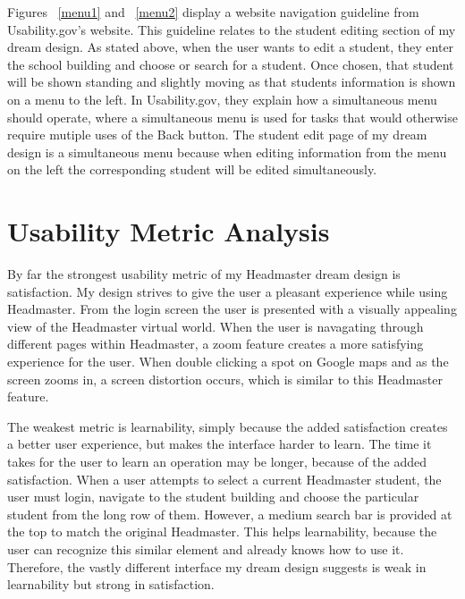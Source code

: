 \documentclass[11pt]{article}
\begin{document}
Figures  ~\ref{menu1} and ~\ref{menu2} display a website navigation guideline from Usability.gov's website. This guideline relates to the student editing section of my dream design. As stated above, when the user wants to edit a student, they enter the school building and choose or search for a student. Once chosen, that student will be shown standing and slightly moving as that students information is shown on a menu to the left. In Usability.gov, they explain how a simultaneous menu should operate, where a simultaneous menu is used for tasks that would otherwise require mutiple uses of the Back button. The student edit page of my dream design is a simultaneous menu because when editing information from the menu on the left the corresponding student will be edited simultaneously. 



\section{Usability Metric Analysis}
By far the strongest usability metric of my Headmaster dream design is satisfaction. My design strives to give the user a pleasant experience while using Headmaster. From the login screen the user is presented with a visually appealing view of the Headmaster virtual world. When the user is navagating through different pages within Headmaster, a zoom feature creates a more satisfying experience for the user. When double clicking a spot on Google maps and as the screen zooms in, a screen distortion occurs, which is similar to this Headmaster feature.

The weakest metric is learnability, simply because the added satisfaction creates a better user experience, but makes the interface harder to learn. The time it takes for the user to learn an operation may be longer, because of the added satisfaction. When a user attempts to select a current Headmaster student, the user must login, navigate to the student building and choose the particular student from the long row of them. However, a medium search bar is provided at the top to match the original Headmaster. This helps learnability, because the user can recognize this similar element and already knows how to use it. Therefore, the vastly different interface my dream design suggests is weak in learnability but strong in satisfaction.
\end{document}
